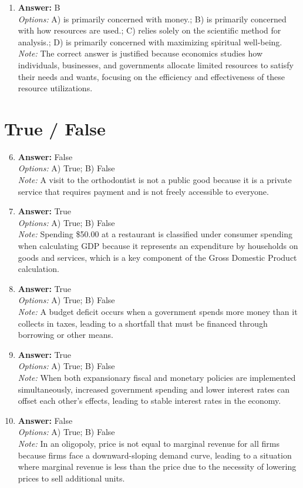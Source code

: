 \documentclass[12pt]{article}
\begin{document}
\begin{enumerate}[label=\arabic*.]
\item \textbf{Answer:} B
\\ \textit{Options:} A) is primarily concerned with money.; B) is primarily concerned with how resources are used.; C) relies solely on the scientific method for analysis.; D) is primarily concerned with maximizing spiritual well-being.
\\ \textit{Note:} The correct answer is justified because economics studies how individuals, businesses, and governments allocate limited resources to satisfy their needs and wants, focusing on the efficiency and effectiveness of these resource utilizations.
\end{enumerate}

\section*{True / False}
\begin{enumerate}[label=\arabic*.]
\setcounter{enumi}{5}
\item \textbf{Answer:} False
\\ \textit{Options:} A) True; B) False
\\ \textit{Note:} A visit to the orthodontist is not a public good because it is a private service that requires payment and is not freely accessible to everyone.
\item \textbf{Answer:} True
\\ \textit{Options:} A) True; B) False
\\ \textit{Note:} Spending \$50.00 at a restaurant is classified under consumer spending when calculating GDP because it represents an expenditure by households on goods and services, which is a key component of the Gross Domestic Product calculation.
\item \textbf{Answer:} True
\\ \textit{Options:} A) True; B) False
\\ \textit{Note:} A budget deficit occurs when a government spends more money than it collects in taxes, leading to a shortfall that must be financed through borrowing or other means.
\item \textbf{Answer:} True
\\ \textit{Options:} A) True; B) False
\\ \textit{Note:} When both expansionary fiscal and monetary policies are implemented simultaneously, increased government spending and lower interest rates can offset each other's effects, leading to stable interest rates in the economy.
\item \textbf{Answer:} False
\\ \textit{Options:} A) True; B) False
\\ \textit{Note:} In an oligopoly, price is not equal to marginal revenue for all firms because firms face a downward-sloping demand curve, leading to a situation where marginal revenue is less than the price due to the necessity of lowering prices to sell additional units.
\end{enumerate}
\end{document}
